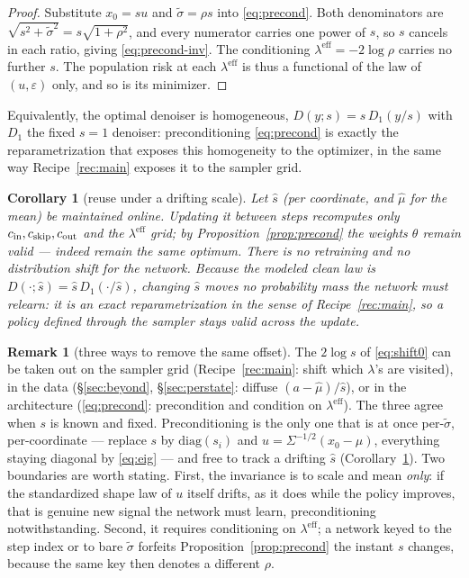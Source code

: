 \documentclass[11pt]{article}
\newtheorem{corollary}[proposition]{Corollary}
\theoremstyle{definition}
\newtheorem{remark}[proposition]{Remark}
\newcommand{\sig}{\tilde\sigma}
\newcommand{\leff}{\lambda^{\mathrm{eff}}}
\begin{document}
\begin{proof}
Substitute $x_0=su$ and $\sig=\rho s$ into \eqref{eq:precond}. Both denominators
are $\sqrt{s^2+\sig^2}=s\sqrt{1+\rho^2}$, and every numerator carries one power of
$s$, so $s$ cancels in each ratio, giving \eqref{eq:precond-inv}. The conditioning
$\leff=-2\log\rho$ carries no further $s$. The population risk at each $\leff$ is
thus a functional of the law of $(u,\varepsilon)$ only, and so is its minimizer.
\end{proof}

Equivalently, the optimal denoiser is homogeneous, $D(y;s)=s\,D_1(y/s)$ with $D_1$
the fixed $s{=}1$ denoiser: preconditioning \eqref{eq:precond} is exactly the
reparametrization that exposes this homogeneity to the optimizer, in the same way
Recipe~\ref{rec:main} exposes it to the sampler grid.

\begin{corollary}[reuse under a drifting scale]
\label{cor:reuse}
Let $\hat s$ (per coordinate, and $\hat\mu$ for the mean) be maintained online.
Updating it between steps recomputes only $c_{\rm in},c_{\rm skip},c_{\rm out}$
and the $\leff$ grid; by Proposition~\ref{prop:precond} the weights $\theta$
remain valid --- indeed remain the same optimum. There is no retraining and no
distribution shift for the network. Because the modeled clean law is
$D(\cdot;\hat s)=\hat s\,D_1(\cdot/\hat s)$, changing $\hat s$ moves no
probability mass the network must relearn: it is an exact reparametrization in
the sense of Recipe~\ref{rec:main}, so a policy defined through the sampler stays
valid across the update.
\end{corollary}

\begin{remark}[three ways to remove the same offset]
The $2\log s$ of \eqref{eq:shift0} can be taken out on the sampler grid
(Recipe~\ref{rec:main}: shift which $\lambda$'s are visited), in the data
(\S\ref{sec:beyond}, \S\ref{sec:perstate}: diffuse $(a-\hat\mu)/\hat s$), or in
the architecture (\eqref{eq:precond}: precondition and condition on $\leff$). The
three agree when $s$ is known and fixed. Preconditioning is the only one that is
at once per-$\sig$, per-coordinate --- replace $s$ by $\mathrm{diag}(s_i)$ and
$u=\Sigma^{-1/2}(x_0-\mu)$, everything staying diagonal by \eqref{eq:eig} --- and
free to track a drifting $\hat s$ (Corollary~\ref{cor:reuse}). Two boundaries are
worth stating. First, the invariance is to scale and mean \emph{only}: if the
standardized shape law of $u$ itself drifts, as it does while the policy improves,
that is genuine new signal the network must learn, preconditioning
notwithstanding. Second, it requires conditioning on $\leff$; a network keyed to
the step index or to bare $\sig$ forfeits Proposition~\ref{prop:precond} the
instant $s$ changes, because the same key then denotes a different $\rho$.
\end{remark}
\end{document}
